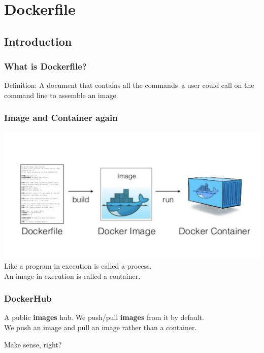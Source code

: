 \documentclass{beamer}
\begin{document}
\section{Dockerfile}
\subsection{Introduction}
\begin{frame}
    \frametitle{What is Dockerfile?}
    \begin{block}{Definition:}
        A {\color{red}{text}} document that contains all the {\color{red} commands}\
        a user could call on the command line to {\color{green} assemble an image}.
    \end{block}
\end{frame}

\begin{frame}
    \frametitle{Image and Container again}
    \centering
    \includegraphics[width=.95\textwidth]{1_p8k1b2DZTQEW_yf0hYniXw.jpg}
    \cite{Build_an_image}\\
    Like a program in execution is called a process.\\
    An image in execution is called a container.
\end{frame}

\begin{frame}
    \frametitle{DockerHub}
    A public \textbf{images} hub. We push/pull \textbf{images} from it by default.\\
    We push an image and pull an image rather than a container.
    \newline
    \newline
    \begin{center}
        Make sense, right?
    \end{center}
\end{frame}
\end{document}
